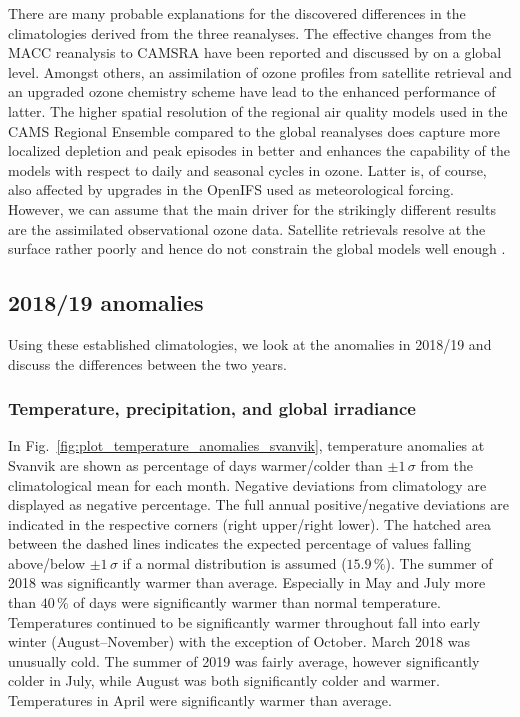 \documentclass[bg, manuscript]{copernicus}
\begin{document}
There are many probable explanations for the discovered differences in the climatologies derived from the three reanalyses. The effective changes from the MACC reanalysis to CAMSRA have been reported and discussed by \citet{ACP:Inness2019} on a global level. Amongst others, an assimilation of ozone profiles from satellite retrieval and an upgraded ozone chemistry scheme have lead to the enhanced performance of latter. The higher spatial resolution of the regional air quality models used in the CAMS Regional Ensemble compared to the global reanalyses does capture more localized depletion and peak episodes in \chem{[O_3]} better and enhances the capability of the models with respect to daily and seasonal cycles in ozone. Latter is, of course, also affected by upgrades in the OpenIFS used as meteorological forcing. However, we can assume that the main driver for the strikingly different results are the assimilated observational ozone data. Satellite retrievals resolve \chem{[O_3]} at the surface rather poorly and hence do not constrain the global models well enough \citet{ACP:Andersson2017}.

\subsection{2018/19 anomalies}
\label{subsec:anomalies}
Using these established climatologies, we look at the anomalies in 2018/19 and discuss the differences between the two years. 

\subsubsection{Temperature, precipitation, and global irradiance}
\label{subsubsec:anomal_tpq}
In Fig.~\ref{fig:plot_temperature_anomalies_svanvik}, temperature anomalies at Svanvik are shown as percentage of days warmer/colder than $\pm 1\,\sigma$ from the climatological mean for each month. Negative deviations from climatology are displayed as negative percentage. The full annual positive/negative deviations are indicated in the respective corners (right upper/right lower). The hatched area between the dashed lines indicates the expected percentage of values falling above/below $\pm 1\,\sigma$ if a normal distribution is assumed ($15.9\,\unit{\%}$). The summer of 2018 was significantly warmer than average. Especially in May and July more than $40\,\unit{\%}$ of days were significantly warmer than normal temperature. Temperatures continued to be significantly warmer throughout fall into early winter (August--November) with the exception of October. March 2018 was unusually cold. The summer of 2019 was fairly average, however significantly colder in July, while August was both significantly colder and warmer. Temperatures in April were significantly warmer than average.
\end{document}
